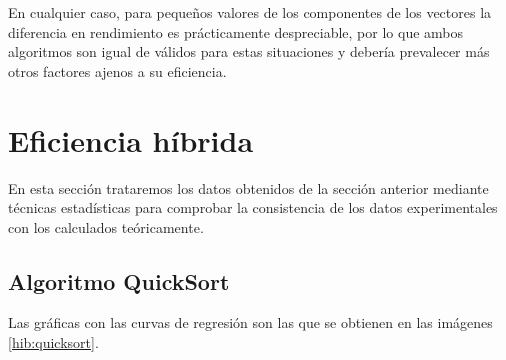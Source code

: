 \documentclass{homework}
\begin{document}
    En cualquier caso, para pequeños valores de los componentes de los vectores la diferencia en rendimiento es prácticamente despreciable, por
    lo que ambos algoritmos son igual de válidos para estas situaciones y debería prevalecer más otros factores ajenos a su eficiencia.

    \newpage
    \section{Eficiencia híbrida} 
    
    En esta sección trataremos los datos obtenidos de la sección anterior mediante técnicas estadísticas para
    comprobar la consistencia de los datos experimentales con los calculados teóricamente. 

    \subsection{Algoritmo QuickSort}

    Las gráficas con las curvas de regresión son las que se obtienen en las imágenes \ref{hib:quicksort}.
\end{document}
